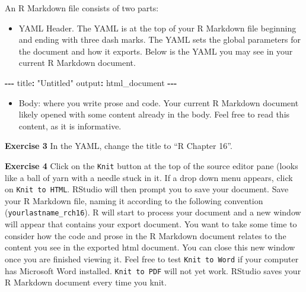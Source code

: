 \documentclass[
]{book}
\makeatletter
\newenvironment{Shaded}{\begin{snugshade}}{\end{snugshade}}
\newcommand{\NormalTok}[1]{#1}
\newcommand{\SpecialCharTok}[1]{\textcolor[rgb]{0.43,0.43,0.43}{\textbf{#1}}}
\newcommand{\StringTok}[1]{\textcolor[rgb]{0.5,0.5,0.5}{#1}}
\providecommand{\tightlist}{%
  \setlength{\itemsep}{0pt}\setlength{\parskip}{0pt}}
\newenvironment{kframe}{%
\medskip{}
\setlength{\fboxsep}{.8em}
 \def\at@end@of@kframe{}%
 \ifinner\ifhmode%
  \def\at@end@of@kframe{\end{minipage}}%
  \begin{minipage}{\columnwidth}%
 \fi\fi%
 \def\FrameCommand##1{\hskip\@totalleftmargin \hskip-\fboxsep
 \colorbox{shadecolor}{##1}\hskip-\fboxsep
     \hskip-\linewidth \hskip-\@totalleftmargin \hskip\columnwidth}%
 \MakeFramed {\advance\hsize-\width
   \@totalleftmargin\z@ \linewidth\hsize
   \@setminipage}}%
 {\par\unskip\endMakeFramed%
 \at@end@of@kframe}
\renewenvironment{Shaded}{\begin{kframe}}{\end{kframe}}
\newenvironment{rmdblock}[1]
  {\begin{shaded*}
  }
  {\end{shaded*}
  }
\newenvironment{learncheck}
  {\begin{rmdblock}{warning}}
  {\end{rmdblock}}
\makeatother
\begin{document}
An R Markdown file consists of two parts:

\begin{itemize}
\tightlist
\item
  YAML Header. The YAML is at the top of your R Markdown file beginning and ending with three dash marks. The YAML sets the global parameters for the document and how it exports. Below is the YAML you may see in your current R Markdown document.
\end{itemize}

\begin{Shaded}
\begin{Highlighting}[]
\SpecialCharTok{{-}{-}{-}}
\NormalTok{title}\SpecialCharTok{:} \StringTok{"Untitled"}
\NormalTok{output}\SpecialCharTok{:}\NormalTok{ html\_document}
\SpecialCharTok{{-}{-}{-}}
\end{Highlighting}
\end{Shaded}

\begin{itemize}
\tightlist
\item
  Body: where you write prose and code. Your current R Markdown document likely opened with some content already in the body. Feel free to read this content, as it is informative.
\end{itemize}

\begin{learncheck}
\textbf{Exercise 3} In the YAML, change the title to ``R Chapter 16''.
\end{learncheck}

\begin{learncheck}
\textbf{Exercise 4} Click on the \texttt{Knit} button at the top of the
source editor pane (looks like a ball of yarn with a needle stuck in it.
If a drop down menu appears, click on \texttt{Knit\ to\ HTML}. RStudio
will then prompt you to save your document. Save your R Markdown file,
naming it according to the following convention
(\texttt{yourlastname\_rch16}). R will start to process your document
and a new window will appear that contains your export document. You
want to take some time to consider how the code and prose in the R
Markdown document relates to the content you see in the exported html
document. You can close this new window once you are finished viewing
it. Feel free to test \texttt{Knit\ to\ Word} if your computer has
Microsoft Word installed. \texttt{Knit\ to\ PDF} will not yet work.
RStudio saves your R Markdown document every time you knit.
\end{learncheck}
\end{document}
